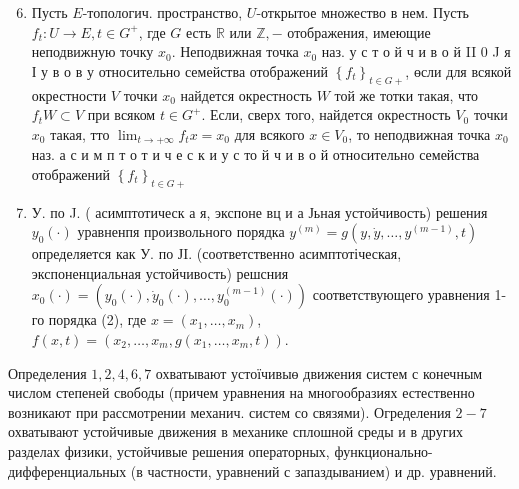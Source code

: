 \documentclass[10pt]{article}
\begin{document}
\begin{enumerate}

  \setcounter{enumi}{5}

  \item Пусть $E$-топологич. пространство, $U$-открытое множество в нем. Пусть $f_{t}: U \longrightarrow E, t \in G^{+}$, где $G$ есть $\mathbb{R}$ или $\mathbb{Z},-$ отображения, имеющие неподвижную точку $x_{0}$. Неподвижная точка $x_{0}$ наз. у с т о й ч и в о й II 0 J я І у в о в у относительно семейства отображений $\left\{f_{t}\right\}_{t \in G+}$, өсли для всякой окрестности $V$ точки $x_{0}$ найдется окрестность $W$ той же тотки такая, что $f_{t} W \subset V$ при всяком $t \in G^{+}$. Если, сверх того, найдется окрестность $V_{0}$ точки $x_{0}$ такая, тто $\lim _{t \rightarrow+\infty} f_{t} x=x_{0}$ для всякого $x \in V_{0}$, то неподвижная точка $x_{0}$ наз. а с и м п т о т и ч е с к и у с то й ч и в о й относительно семейства отображений $\left\{f_{t}\right\}_{t \in G+}$



  \item У. по J. ( асимптотическ а я, экспоне вц и а Јьная устойчивость) решения $y_{0}(\cdot)$ уравненпя произвольного порядка $y^{(m)}=g\left(y, \dot{y}, \ldots, y^{(m-1)}, t\right)$ определяется как У. по ЈI. (соответственно асимптотіческая, экспоненциальная устойчивость) решсния $x_{0}(\cdot)=\left(y_{0}(\cdot), \dot{y}_{0}(\cdot), \ldots, y_{0}^{(m-1)}(\cdot)\right)$ соответствующего уравнения 1-го порядка (2), где $x=\left(x_{1}, \ldots, x_{m}\right)$, $f(x, t)=\left(x_{2}, \ldots, x_{m}, g\left(x_{1}, \ldots, x_{m}, t\right)\right)$.



\end{enumerate}



Определения $1,2,4,6,7$ охватывают устоїчивыө движения систем с конечным числом степеней свободы (причем уравнения на многообразиях естественно возникают при рассмотрении механич. систем со связями). Огределения $2-7$ охватывают устойчивые движения в механике сплошной среды и в других разделах физики, устойчивые решения операторных, функционально-дифференциальных (в частности, уравнений с запаздыванием) и др. уравнений.
\end{document}
